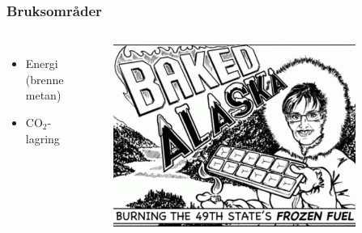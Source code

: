 \documentclass[utf8x, notes, graphics]{beamer}
\begin{document}
\begin{frame}
\frametitle{Bruksområder}
\begin{columns}
\begin{itemize}
\item Energi (brenne metan)
\item CO$_2$-lagring
\end{itemize}
\begin{figure}
\includegraphics[width=0.9\textwidth]{../pictures/baked_alaska.pdf}
\end{figure}
\end{columns}
\end{frame}
\end{document}
